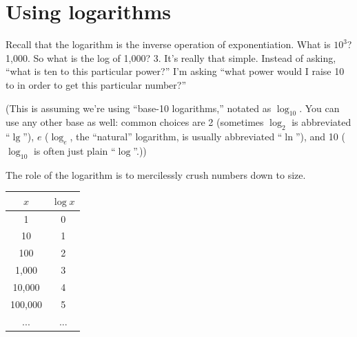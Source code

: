 
%
%
%

\chapter{Using logarithms}


Recall that the logarithm is the inverse operation of exponentiation. What is
$10^3$? 1,000. So what is the log of 1,000? 3. It's really that simple.
Instead of asking, ``what is ten to this particular power?'' I'm asking ``what
power would I raise 10 to in order to get this particular number?''

(This is assuming we're using ``base-10 logarithms,'' notated as
$\log_{10}$. You can use any other base as well: common choices are 
2 (sometimes $\log_{2}$ is abbreviated ``$\lg$''),
$e$ ($\log_{e}$, the ``natural'' logarithm, is usually abbreviated ``$\ln$''),
and 10 ($\log_{10}$ is often just plain ``$\log$''.))

The role of the logarithm is to mercilessly crush numbers down to size.

\begin{center}
\begin{tabular}{c|c}
$x$ & $\log x$ \\
\hline
1 & 0 \\
10 & 1 \\
100 & 2 \\
1,000 & 3 \\
10,000 & 4 \\
100,000 & 5 \\
... & ... \\
\end{tabular}
\end{center}

